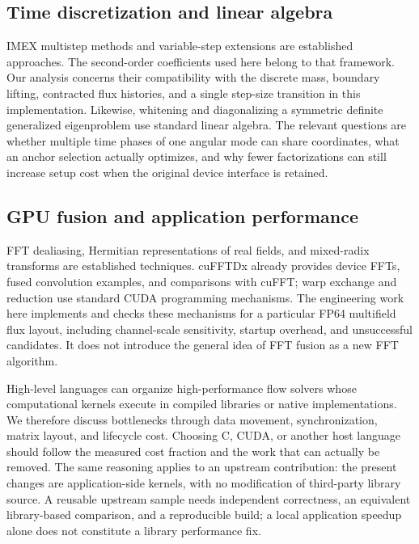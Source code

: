 \subsection{Time discretization and linear algebra}

IMEX multistep methods and variable-step extensions are established approaches\cite{r9,r12}. The second-order coefficients used here belong to that framework. Our analysis concerns their compatibility with the discrete mass, boundary lifting, contracted flux histories, and a single step-size transition in this implementation. Likewise, whitening and diagonalizing a symmetric definite generalized eigenproblem use standard linear algebra\cite{r10}. The relevant questions are whether multiple time phases of one angular mode can share coordinates, what an anchor selection actually optimizes, and why fewer factorizations can still increase setup cost when the original device interface is retained.

\subsection{GPU fusion and application performance}

FFT dealiasing, Hermitian representations of real fields, and mixed-radix transforms are established techniques\cite{r11,r13}. cuFFTDx already provides device FFTs, fused convolution examples, and comparisons with cuFFT\cite{r17}; warp exchange and reduction use standard CUDA programming mechanisms\cite{r18}. The engineering work here implements and checks these mechanisms for a particular FP64 multifield flux layout, including channel-scale sensitivity, startup overhead, and unsuccessful candidates. It does not introduce the general idea of FFT fusion as a new FFT algorithm.

High-level languages can organize high-performance flow solvers whose computational kernels execute in compiled libraries or native implementations\cite{r14}. We therefore discuss bottlenecks through data movement, synchronization, matrix layout, and lifecycle cost. Choosing C, CUDA, or another host language should follow the measured cost fraction and the work that can actually be removed. The same reasoning applies to an upstream contribution: the present changes are application-side kernels, with no modification of third-party library source. A reusable upstream sample needs independent correctness, an equivalent library-based comparison, and a reproducible build; a local application speedup alone does not constitute a library performance fix.

